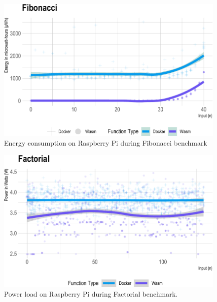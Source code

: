\documentclass[
  table]{report}
\begin{document}
\begin{figure}[H]

{\centering \includegraphics{thesis_files/figure-latex/fib-energy-1} 

}

\caption{Energy consumption on Raspberry Pi during Fibonacci benchmark}\label{fig:fib-energy}
\end{figure}

\newpage

\begin{figure}[H]

{\centering \includegraphics{thesis_files/figure-latex/fact-power-1} 

}

\caption{Power load on Raspberry Pi during Factorial benchmark.}\label{fig:fact-power}
\end{figure}
\end{document}
